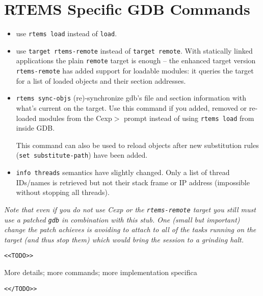 \documentclass{article}
\newcommand{\cmd}[1]{{\tt #1}}
\begin{document}
\section{RTEMS Specific GDB Commands}
\begin{itemize}
\item
use \cmd{rtems load} instead of \cmd{load}.

\item
use \cmd{target rtems-remote} instead of \cmd{target remote}.
With statically linked applications the plain \cmd{remote}
target is enough -- the enhanced target version \cmd{rtems-remote} has added
support for loadable modules: it queries the target for
a list of loaded objects and their section addresses.

\item
\cmd{rtems sync-objs} (re)-synchronize gdb's file and section information
	  with what's current on the target. Use this command if you
	  added, removed or re-loaded modules from the Cexp$>$ prompt
	  instead of using \cmd{rtems load} from inside GDB.

	  This command can also be used to reload objects after
	  new substitution rules ({\tt set substitute-path}) have
      been added.

\item
\cmd{info threads} semantics have slightly changed. Only a list
	  of thread IDs/names is retrieved but not their stack frame
	  or IP address (impossible without stopping all threads).
\end{itemize}

{\em Note that even if you do not use Cexp or the {\tt rtems-remote}
target you still must use a patched {\tt gdb} in combination with this
stub. One (small but important) change the patch achieves is avoiding
to attach to all of the tasks running on the target  (and thus stop them) 
which would bring the session to a grinding halt.}

\verb|<<TODO>>|

	More details; more commands; more implementation specifica

\verb|<</TODO>>|
	
\end{document}
